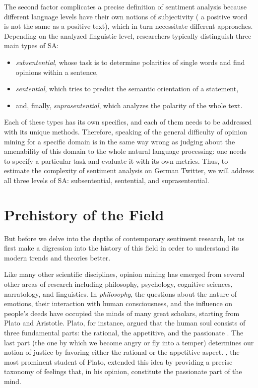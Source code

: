 The second factor complicates a precise definition of sentiment
analysis because different language levels have their own notions of
subjectivity (\eg{} a positive word is not the same as a positive
text), which in turn necessitate different approaches.  Depending on
the analyzed linguistic level, researchers typically distinguish three
main types of SA:
\begin{itemize}
  \item\emph{subsentential}, whose task is to determine polarities of
    single words and find opinions within a sentence,
  \item\emph{sentential}, which tries to predict the semantic
    orientation of a statement,
  \item and, finally, \emph{suprasentential}, which analyzes the
    polarity of the whole text.
\end{itemize}
Each of these types has its own specifics, and each of them needs to
be addressed with its unique methods.  Therefore, speaking of the
general difficulty of opinion mining for a specific domain is in the
same way wrong as judging about the amenability of this domain to the
whole natural language processing: one needs to specify a particular
task and evaluate it with its own metrics.  Thus, to estimate the
complexity of sentiment analysis on German Twitter, we will address
all three levels of SA: subsentential, sentential, and
suprasentential.

\section{Prehistory of the Field}

But before we delve into the depths of contemporary sentiment
research, let us first make a digression into the history of this
field in order to understand its modern trends and theories better.

Like many other scientific disciplines, opinion mining has emerged
from several other areas of research including philosophy, psychology,
cognitive sciences, narratology, and linguistics.  In
\emph{philosophy}, the questions about the nature of emotions, their
interaction with human consciousness, and the influence on people's
deeds have occupied the minds of many great scholars, starting from
Plato and Aristotle.  Plato, for instance, argued that the human soul
consists of three fundamental parts: the rational, the appetitive, and
the passionate \citep[see][Book~IV]{Plato:91}.  The last part (the one
by which we become angry or fly into a temper) determines our notion
of justice by favoring either the rational or the appetitive aspect.
\citet{Aristotle:54}, the most prominent student of Plato, extended
this idea by providing a precise taxonomy of feelings that, in his
opinion, constitute the passionate part of the mind.

